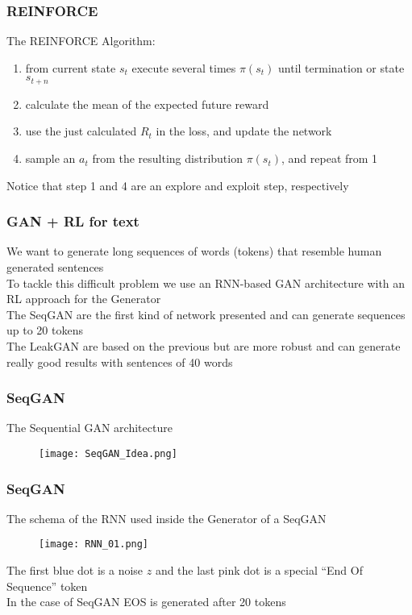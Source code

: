 \documentclass{beamer}
\begin{document}
\begin{frame}
\frametitle{REINFORCE}
The REINFORCE Algorithm:
\begin{enumerate}
  \item from current state $s_t$ execute several times $\pi(s_t)$ until termination or state $s_{t+n}$
  \item calculate the mean of the expected future reward
  \item use the just calculated $R_t$ in the loss, and update the network
  \item sample an $a_t$ from the resulting distribution $\pi(s_t)$, and repeat from 1
\end{enumerate}
Notice that step 1 and 4 are an explore and exploit step, respectively
\end{frame}


\begin{frame}
\frametitle{GAN + RL for text}
We want to generate long sequences of words (tokens) that resemble human generated sentences
\\
To tackle this difficult problem we use an RNN-based GAN architecture with an RL approach for the Generator
\\
\vspace{0.5cm}
The SeqGAN are the first kind of network presented and can generate sequences up to 20 tokens
\\
\vspace{0.5cm}
The LeakGAN are based on the previous but are more robust and can generate really good results with sentences of 40 words
\end{frame}

\begin{frame}
\frametitle{SeqGAN}
The Sequential GAN architecture
\begin{figure}[ht]
  \texttt{[image: SeqGAN\_Idea.png]}
\end{figure}
\end{frame}

\begin{frame}
\frametitle{SeqGAN}
The schema of the RNN used inside the Generator of a SeqGAN
\begin{figure}[ht]
  \texttt{[image: RNN\_01.png]}
\end{figure}
The first blue dot is a noise $z$ and the last pink dot is a special ``End Of Sequence'' token 
\\
In the case of SeqGAN EOS is generated after 20 tokens
\end{frame}
\end{document}
